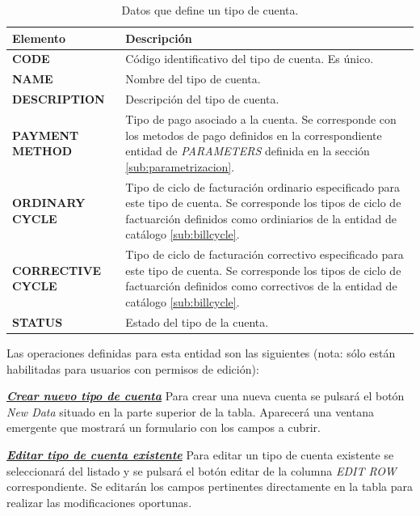 \begin{table}[H]
  \centering
  \setlength{\leftmargini}{0.4cm}
  \resizebox{14cm}{!} {
  \begin{tabular}{|m{3cm} m{11cm}|}
  \rowcolor{udcpink!25}
  \hline
  	\textbf{Elemento} & \textbf{Descripción} \\\hline
	\textbf{CODE} & Código identificativo del tipo de cuenta. Es único.   \\
	\textbf{NAME} & Nombre del tipo de cuenta. \\
	\textbf{DESCRIPTION} & Descripción del tipo de cuenta. \\	
	\textbf{PAYMENT METHOD} & Tipo de pago asociado a la cuenta. Se corresponde con los metodos de pago definidos en la correspondiente entidad de \emph{PARAMETERS} definida en la sección \ref{sub:parametrizacion}. \\	
	\textbf{ORDINARY CYCLE} & Tipo de ciclo de facturación ordinario especificado para este tipo de cuenta. Se corresponde los tipos de ciclo de factuarción definidos como ordiniarios de la entidad de catálogo \ref{sub:billcycle}. \\	 		\textbf{CORRECTIVE CYCLE} & Tipo de ciclo de facturación correctivo especificado para este tipo de cuenta. Se corresponde los tipos de ciclo de factuarción definidos como correctivos de la entidad de catálogo \ref{sub:billcycle}. \\	
	\textbf{STATUS} & Estado del tipo de la cuenta.
	\\\hline
  \end{tabular}
  } %
  \caption{Datos que define un tipo de cuenta.}
  \label{tab:tipo-cuenta}
\end{table}

Las operaciones definidas para esta entidad son las siguientes (nota: sólo están habilitadas para usuarios con permisos de edición):

\underline{\textsl{\textbf{Crear nuevo tipo de cuenta}}}\newline
Para crear una nueva cuenta se pulsará el botón \textit{New Data} situado en la parte superior de la tabla. Aparecerá una ventana emergente que mostrará un formulario con los campos a cubrir.

\underline{\textsl{\textbf{Editar tipo de cuenta existente}}}\newline
Para editar un tipo de cuenta existente se seleccionará del listado y se pulsará el botón editar de la columna \textit{EDIT ROW} correspondiente. Se editarán los campos pertinentes directamente en la tabla para realizar las modificaciones oportunas. 


